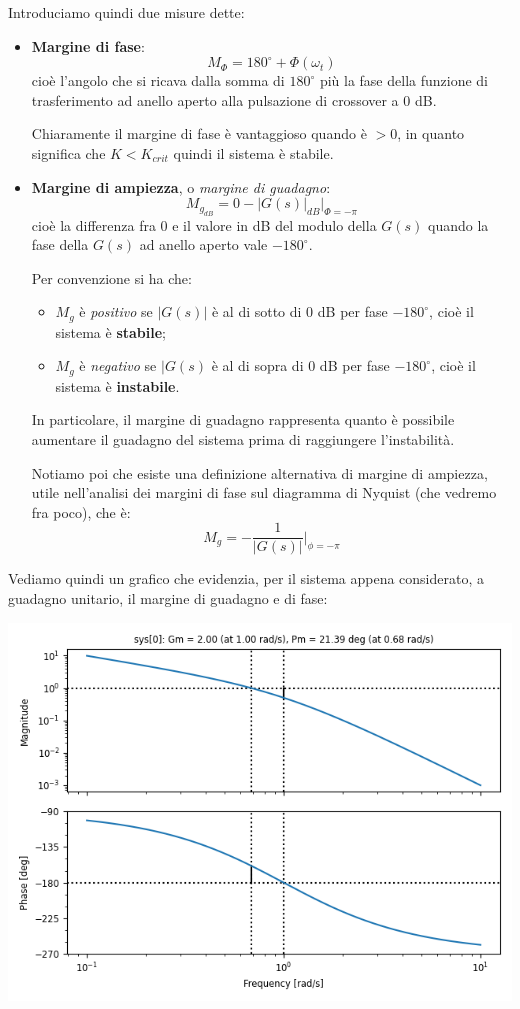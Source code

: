 \documentclass[a4paper,11pt]{article}
\begin{document}
Introduciamo quindi due misure dette:
\begin{itemize}
	\item \textbf{Margine di fase}:
		$$
			M_\Phi = 180^\circ + \Phi(\omega_t)
		$$
		cioè l'angolo che si ricava dalla somma di $180^\circ$ più la fase della funzione di trasferimento ad anello aperto alla pulsazione di crossover a 0 dB.

		Chiaramente il margine di fase è vantaggioso quando è $> 0$, in quanto significa che $K < K_{crit}$  quindi il sistema è stabile.
	\item \textbf{Margine di ampiezza}, o \textit{margine di guadagno}:
		$$
			M_{g_{dB}} = 0 - |G(s)|_{dB} \big|_{\Phi = - \pi}
		$$
		cioè la differenza fra 0 e il valore in dB del modulo della $G(s)$ quando la fase della $G(s)$ ad anello aperto vale $-180^\circ$.

		Per convenzione si ha che:
		\begin{itemize}
			\item $M_g$ è \textit{positivo} se $|G(s)|$ è al di sotto di 0 dB per fase $-180^\circ$, cioè il sistema è \textbf{stabile};
			\item $M_g$ è \textit{negativo} se $|G(s)$ è al di sopra di 0 dB per fase $-180^\circ$, cioè il sistema è \textbf{instabile}.
		\end{itemize}

	In particolare, il margine di guadagno rappresenta quanto è possibile aumentare il guadagno del sistema prima di raggiungere l'instabilità.

	Notiamo poi che esiste una definizione alternativa di margine di ampiezza, utile nell'analisi dei margini di fase sul diagramma di Nyquist (che vedremo fra poco), che è:
	$$
	M_g = -\frac{1}{|G(s)|} \Bigg|_{\phi = -\pi}
	$$
\end{itemize}

Vediamo quindi un grafico che evidenzia, per il sistema appena considerato, a guadagno unitario, il margine di guadagno e di fase:

\begin{center}
	\includegraphics[scale=0.8]{../figures/margins.png}
\end{center}
\end{document}
